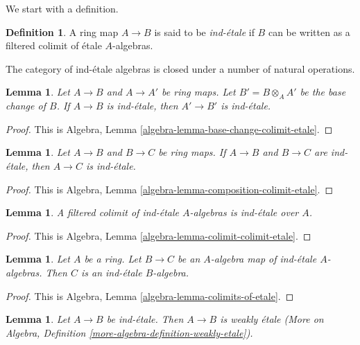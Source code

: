 \documentclass{stacks-project}
\theoremstyle{plain}
\newtheorem{lemma}[subsection]{Lemma}
\theoremstyle{definition}
\newtheorem{definition}[subsection]{Definition}
\theoremstyle{remark}
\numberwithin{equation}{subsection}
\begin{document}
\noindent
We start with a definition.

\begin{definition}
\label{definition-ind-etale}
A ring map $A \to B$ is said to be {\it ind-\'etale} if $B$ can be written
as a filtered colimit of \'etale $A$-algebras.
\end{definition}

\noindent
The category of ind-\'etale algebras is closed under a number of natural
operations.

\begin{lemma}
\label{lemma-base-change-ind-etale}
Let $A \to B$ and $A \to A'$ be ring maps. Let $B' = B \otimes_A A'$
be the base change of $B$.
If $A \to B$ is ind-\'etale, then $A' \to B'$ is ind-\'etale.
\end{lemma}

\begin{proof}
This is Algebra, Lemma \ref{algebra-lemma-base-change-colimit-etale}.
\end{proof}

\begin{lemma}
\label{lemma-composition-ind-etale}
Let $A \to B$ and $B \to C$ be ring maps. If $A \to B$ and $B \to C$
are ind-\'etale, then $A \to C$ is ind-\'etale.
\end{lemma}

\begin{proof}
This is Algebra, Lemma \ref{algebra-lemma-composition-colimit-etale}.
\end{proof}

\begin{lemma}
\label{lemma-ind-ind-etale}
A filtered colimit of ind-\'etale $A$-algebras is ind-\'etale over $A$.
\end{lemma}

\begin{proof}
This is Algebra, Lemma \ref{algebra-lemma-colimit-colimit-etale}.
\end{proof}

\begin{lemma}
\label{lemma-ind-etale-permanence}
Let $A$ be a ring. Let $B \to C$ be an $A$-algebra map of ind-\'etale
$A$-algebras. Then $C$ is an ind-\'etale $B$-algebra.
\end{lemma}

\begin{proof}
This is Algebra, Lemma \ref{algebra-lemma-colimits-of-etale}.
\end{proof}

\begin{lemma}
\label{lemma-ind-etale-implies}
Let $A \to B$ be ind-\'etale. Then $A \to B$ is weakly \'etale
(More on Algebra, Definition \ref{more-algebra-definition-weakly-etale}).
\end{lemma}
\end{document}
